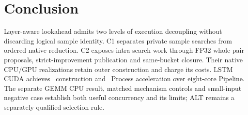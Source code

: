 \section{Conclusion}
Layer-aware lookahead admits two levels of execution decoupling without discarding logical sample identity. C1 separates private sample searches from ordered native reduction. C2 exposes intra-search work through FP32 whole-pair proposals, strict-improvement publication and same-bucket closure. Their native CPU/GPU realizations retain outer construction and charge its costs. LSTM CUDA achieves \LstmPipeBuild\ construction and \LstmPipeProc\ Process acceleration over eight-core Pipeline. The separate GEMM CPU result, matched mechanism controls and small-input negative case establish both useful concurrency and its limits; ALT remains a separately qualified selection rule.
